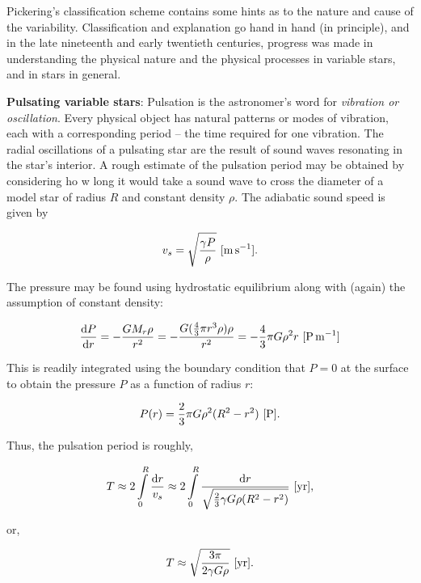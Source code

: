 \documentclass[a4paper,10pt]{article}
\begin{document}
{\noindent}Pickering's classification scheme contains some hints as to the nature and cause of the variability. Classification and explanation go hand in hand (in principle), and in the late nineteenth and early twentieth centuries, progress was made in understanding the physical nature and the physical processes in variable stars, and in stars in general.

{\noindent}\textbf{Pulsating variable stars}: Pulsation is the astronomer's word for \textit{vibration or oscillation}. Every physical object has natural patterns or modes of vibration, each with a corresponding period -- the time required for one vibration. The radial oscillations of a pulsating star are the result of sound waves resonating in the star's interior. A rough estimate of the pulsation period may be obtained by considering ho w long it would take a sound wave to cross the diameter of a model star of radius $R$ and constant density $\rho$. The adiabatic sound speed is given by

\begin{align*}
    v_s = \sqrt{\frac{\gamma P}{\rho}} ~ [{\rm m\,s^{-1}}].
\end{align*}

{\noindent}The pressure may be found using hydrostatic equilibrium along with (again) the assumption of constant density:

\begin{align*}
    \frac{{\rm d}P}{{\rm d}r} = -\frac{GM_r\rho}{r^2} = -\frac{G(\frac{4}{3}\pi r^3\rho)\rho}{r^2} = -\frac{4}{3}\pi G\rho^2r ~ [{\rm P\,m^{-1}}]
\end{align*}

{\noindent}This is readily integrated using the boundary condition that $P=0$ at the surface to obtain the pressure $P$ as a function of radius $r$: 

\begin{align*}
    P(r) = \frac{2}{3}\pi G\rho^2(R^2-r^2) ~ [{\rm P}].
\end{align*}

{\noindent}Thus, the pulsation period is roughly,

\begin{align*}
    T \approx 2\int\limits_0^R \frac{{\rm d}r}{v_s} \approx 2\int\limits_0^R \frac{{\rm d}r}{\sqrt{\frac{2}{3}\gamma G\rho(R^2-r^2)}} ~ [{\rm yr}],
\end{align*}

{\noindent}or,

\begin{align*}
    T \approx \sqrt{\frac{3\pi}{2\gamma G\rho}} ~ [{\rm yr}].
\end{align*}
\end{document}
